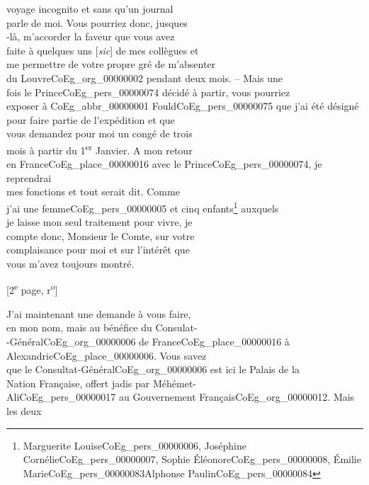 \documentclass{book}
\begin{document}
voyage incognito et sans qu’un journal\\
parle de moi. Vous pourriez donc, jusques\\
-là, m’accorder la faveur que vous avez\\
faite à quelques uns {[\textit{sic}]} de mes collègues et\\
me permettre de votre propre gré de m’absenter\\
du Louvre\gls{CoEg_org_00000002} pendant deux mois. – Mais une\\
fois le Prince\gls{CoEg_pers_00000074} décidé à partir, vous pourriez\\
exposer à \gls{CoEg_abbr_00000001} Fould\gls{CoEg_pers_00000075} que j’ai été désigné\\
pour faire partie de l’expédition et que\\
vous demandez pour moi un congé de trois\\
mois à partir du 1\textsuperscript{er} Janvier. A mon retour\\
en France\gls{CoEg_place_00000016} avec le Prince\gls{CoEg_pers_00000074}, je reprendrai\\
mes fonctions et tout serait dit. Comme\\
j’ai une femme\gls{CoEg_pers_00000005} et cinq enfants\footnote{Marguerite Louise\gls{CoEg_pers_00000006}, Joséphine Cornélie\gls{CoEg_pers_00000007}, Sophie Éléonore\gls{CoEg_pers_00000008}, Émilie Marie\gls{CoEg_pers_00000083}Alphonse Paulin\gls{CoEg_pers_00000084}} auxquels\\
je laisse mon seul traitement pour vivre, je\\
compte donc, Monsieur le Comte, sur votre\\
complaisance pour moi et sur l’intérêt que\\
vous m’avez toujours montré.
{\footnotesize\begin{center} {[2\textsuperscript{e} page, r\textsuperscript{o}]}\end{center}}
\indent J’ai maintenant une demande à vous faire,\\
en mon nom, mais au bénéfice du Consulat-\\
-Général\gls{CoEg_org_00000006} de France\gls{CoEg_place_00000016} à Alexandrie\gls{CoEg_place_00000006}. Vous savez\\
que le Consultat-Général\gls{CoEg_org_00000006} est ici le Palais de la\\
Nation Française, offert jadis par Méhémet-\\
Ali\gls{CoEg_pers_00000017} au Gouvernement Français\gls{CoEg_org_00000012}. Mais les deux\\
\end{document}
